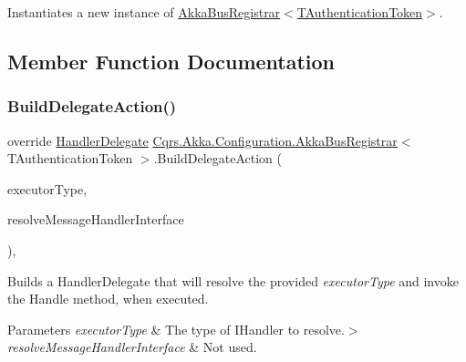 Instantiates a new instance of \hyperlink{classCqrs_1_1Akka_1_1Configuration_1_1AkkaBusRegistrar_a49ab48e3305b6eb17f2a68fc2996a988_a49ab48e3305b6eb17f2a68fc2996a988}{Akka\+Bus\+Registrar$<$\+T\+Authentication\+Token$>$}. 



\subsection{Member Function Documentation}
\mbox{\label{classCqrs_1_1Akka_1_1Configuration_1_1AkkaBusRegistrar_ad7e3e5d332d5b4d781375a28f23bdb19_ad7e3e5d332d5b4d781375a28f23bdb19}} 
\subsubsection{\texorpdfstring{Build\+Delegate\+Action()}{BuildDelegateAction()}}
{\footnotesize\ttfamily override \hyperlink{classCqrs_1_1Configuration_1_1HandlerDelegate}{Handler\+Delegate} \hyperlink{classCqrs_1_1Akka_1_1Configuration_1_1AkkaBusRegistrar}{Cqrs.\+Akka.\+Configuration.\+Akka\+Bus\+Registrar}$<$ T\+Authentication\+Token $>$.Build\+Delegate\+Action (\begin{DoxyParamCaption}\item[{Type}]{executor\+Type,  }\item[{Func$<$ Type, I\+Enumerable$<$ Type $>$$>$}]{resolve\+Message\+Handler\+Interface }\end{DoxyParamCaption})\hspace{0.3cm}{\ttfamily [protected]}, {\ttfamily [virtual]}}



Builds a Handler\+Delegate that will resolve the provided {\itshape executor\+Type}  and invoke the Handle method, when executed. 


\begin{DoxyParams}{Parameters}
{\em executor\+Type} & The type of I\+Handler to resolve.$>$\\
\hline
{\em resolve\+Message\+Handler\+Interface} & Not used.\\
\hline
\end{DoxyParams}



